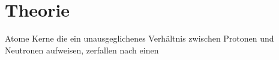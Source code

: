 \section{Theorie}
\label{sec:Theorie}

Atome Kerne die ein unausgeglichenes Verhältnis zwischen Protonen und Neutronen aufweisen, zerfallen nach einen 